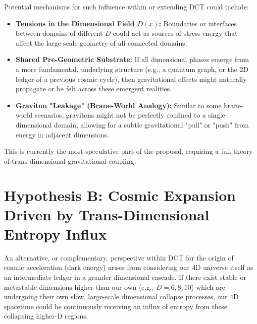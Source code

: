 \documentclass[a4paper, 12pt, oneside]{book}
\numberwithin{equation}{chapter}
\begin{document}
Potential mechanisms for such influence within or extending DCT could include:
\begin{itemize}
    \item \textbf{Tensions in the Dimensional Field $D(x)$:} Boundaries or interfaces between domains of different $D$ could act as sources of stress-energy that affect the large-scale geometry of all connected domains.
    \item \textbf{Shared Pre-Geometric Substrate:} If all dimensional phases emerge from a more fundamental, underlying structure (e.g., a quantum graph, or the 2D ledger of a previous cosmic cycle), then gravitational effects might naturally propagate or be felt across these emergent realities.
    \item \textbf{Graviton "Leakage" (Brane-World Analogy):} Similar to some brane-world scenarios, gravitons might not be perfectly confined to a single dimensional domain, allowing for a subtle gravitational "pull" or "push" from energy in adjacent dimensions.
\end{itemize}
This is currently the most speculative part of the proposal, requiring a full theory of trans-dimensional gravitational coupling.

\section[Hypothesis B: Trans-Dimensional Entropy Influx]{Hypothesis B: Cosmic Expansion Driven by Trans-Dimensional Entropy Influx}
\label{sec:EntropyInfluxDE}

An alternative, or complementary, perspective within DCT for the origin of cosmic acceleration (dark energy) arises from considering our 4D universe itself as an intermediate ledger in a grander dimensional cascade. If there exist stable or metastable dimensions higher than our own (e.g., $D=6, 8, 10$) which are undergoing their own slow, large-scale dimensional collapse processes, our 4D spacetime could be continuously receiving an influx of entropy from these collapsing higher-D regions.
\end{document}
